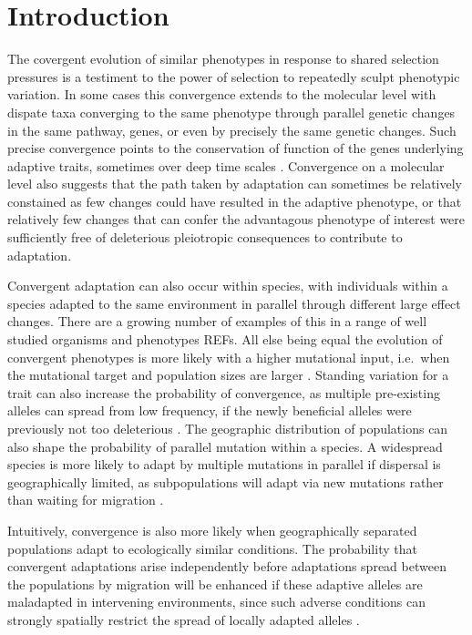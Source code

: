 \documentclass{article}
\begin{document}
\section{Introduction}

The covergent evolution of similar phenotypes in response to shared
selection pressures is a testiment to the power of selection to
repeatedly sculpt phenotypic variation. 
In some cases this convergence extends to the molecular level with
dispate taxa converging to the same phenotype through parallel genetic
changes in the same pathway, genes, 
or even by precisely the same genetic changes. Such precise
convergence points to the conservation of function of the genes
underlying adaptive traits, 
sometimes over deep time scales \citep{deephomologypapers}. Convergence on a molecular level also suggests that the path taken by adaptation can sometimes be relatively constained as few changes could have resulted in the adaptive phenotype, or that relatively few changes that can confer the advantagous phenotype of interest were sufficiently free of deleterious pleiotropic consequences to contribute to adaptation. 


Convergent adaptation can also occur within species, with individuals within a species 
adapted to the same environment in parallel through different large effect changes. 
There are a growing number of examples of this in a range of well studied organisms and phenotypes REFs.
All else being equal the evolution of convergent phenotypes is more
likely with a 
higher mutational input, i.e.\ when the mutational target and population sizes are larger \citep{}. 
Standing variation for a trait can also increase the probability of convergence, 
as multiple pre-existing alleles can spread from low frequency, 
if the newly beneficial alleles were previously not too deleterious \citep{Orr,Hermission}. 
The geographic distribution of populations can also shape the probability of parallel mutation within a species.
A widespread species is more likely to adapt by multiple mutations in parallel if dispersal 
is geographically limited, as subpopulations will adapt via new mutations rather than waiting for migration \citep{RalphCoop}. 


Intuitively, convergence is also more likely 
when geographically separated populations adapt to ecologically similar conditions. 
The probability that convergent adaptations arise independently
before adaptations spread between the populations by migration
will be enhanced if these adaptive alleles are maladapted in intervening environments,
since such adverse conditions can strongly spatially restrict the spread of locally adapted alleles \citep{slatkin}.
 
\end{document}
